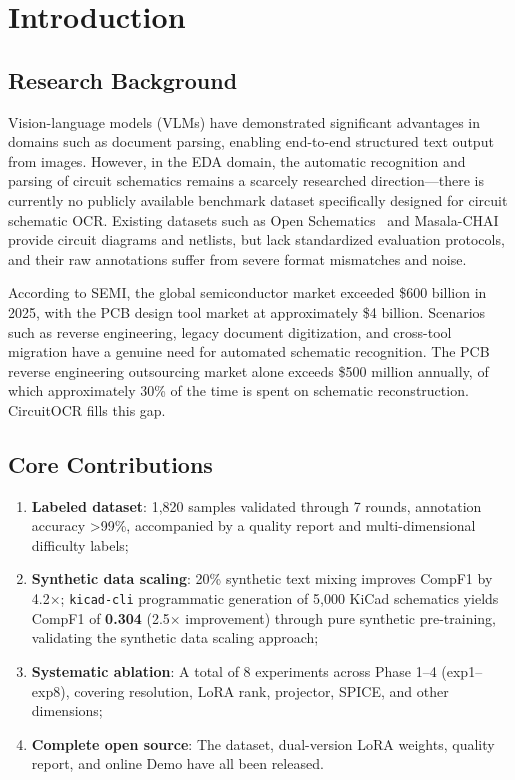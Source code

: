 \section{Introduction}

\subsection{Research Background}

Vision-language models (VLMs) have demonstrated significant advantages in domains such as document parsing, enabling end-to-end structured text output from images. However, in the EDA domain, the automatic recognition and parsing of circuit schematics remains a scarcely researched direction---there is currently no publicly available benchmark dataset specifically designed for circuit schematic OCR. Existing datasets such as Open Schematics~\citep{openschematics2025} and Masala-CHAI~\citep{bhandari2025masalachai} provide circuit diagrams and netlists, but lack standardized evaluation protocols, and their raw annotations suffer from severe format mismatches and noise.

According to SEMI, the global semiconductor market exceeded \$600 billion in 2025, with the PCB design tool market at approximately \$4 billion. Scenarios such as reverse engineering, legacy document digitization, and cross-tool migration have a genuine need for automated schematic recognition. The PCB reverse engineering outsourcing market alone exceeds \$500 million annually, of which approximately 30\% of the time is spent on schematic reconstruction. CircuitOCR fills this gap.

\subsection{Core Contributions}

\begin{enumerate}[nosep]
    \item \textbf{Labeled dataset}: 1,820 samples validated through 7 rounds, annotation accuracy >99\%, accompanied by a quality report and multi-dimensional difficulty labels;
    \item \textbf{Synthetic data scaling}: 20\% synthetic text mixing improves CompF1 by 4.2$\times$; \texttt{kicad-cli} programmatic generation of 5,000 KiCad schematics yields CompF1 of \textbf{0.304} (2.5$\times$ improvement) through pure synthetic pre-training, validating the synthetic data scaling approach;
    \item \textbf{Systematic ablation}: A total of 8 experiments across Phase 1--4 (exp1--exp8), covering resolution, LoRA rank, projector, SPICE, and other dimensions;
    \item \textbf{Complete open source}: The dataset, dual-version LoRA weights, quality report, and online Demo have all been released.
\end{enumerate}


